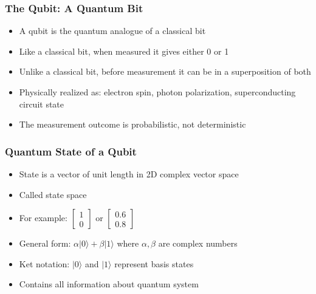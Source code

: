 \begin{frame}[fragile]\frametitle{The Qubit: A Quantum Bit}
\begin{itemize}
\item A qubit is the quantum analogue of a classical bit
\item Like a classical bit, when measured it gives either 0 or 1
\item Unlike a classical bit, before measurement it can be in a superposition of both
\item Physically realized as: electron spin, photon polarization, superconducting circuit state
\item The measurement outcome is probabilistic, not deterministic
\end{itemize}
\end{frame}

\begin{frame}[fragile]\frametitle{Quantum State of a Qubit}
\begin{itemize}
\item State is a vector of unit length in 2D complex vector space
\item Called state space
\item For example: $\begin{bmatrix} 1 \\ 0 \end{bmatrix}$ or $\begin{bmatrix} 0.6 \\ 0.8 \end{bmatrix}$
\item General form: $\alpha|0\rangle + \beta|1\rangle$ where $\alpha, \beta$ are complex numbers
\item Ket notation: $|0\rangle$ and $|1\rangle$ represent basis states
\item Contains all information about quantum system
\end{itemize}
\end{frame}

